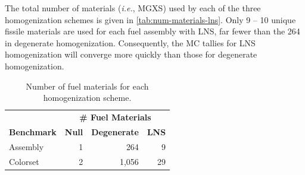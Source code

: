 The total number of materials (\textit{i.e.}, MGXS) used by each of the three homogenization schemes is given in \autoref{tab:num-materials-lns}. Only 9 -- 10 unique fissile materials are used for each fuel assembly with LNS, far fewer than the 264 in degenerate homogenization. Consequently, the MC tallies for LNS homogenization will converge more quickly than those for degenerate homogenization. 

\begin{table}[h!]
  \centering
  \caption{Number of fuel materials for each homogenization scheme.}
  \small
  \label{tab:num-materials-lns}
  \vspace{6pt}
  \begin{tabular}{l r r r}
  \toprule
  & \multicolumn{3}{c}{\bf \# Fuel Materials} \\
  \cline{2-4}
  \multirow{-2}{*}{\bf Benchmark} & \textbf{Null} & \textbf{Degenerate} & \textbf{LNS} \\
  \midrule
Assembly & 1 & 264 & 9 \\
Colorset & 2 & 1,056 & 29 \\
  \bottomrule
\end{tabular}
\end{table}

